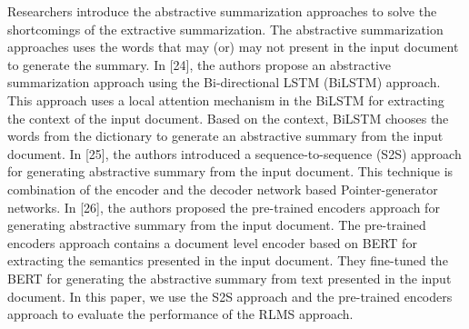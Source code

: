 \documentclass[preprint,review,12pt]{elsarticle}
\begin{document}
Researchers introduce the abstractive summarization approaches \cite{24,25,26} to solve the shortcomings of the extractive summarization. The abstractive summarization approaches uses the words that may (or) may not present in the input document to generate the summary. In [24], the authors propose an abstractive summarization approach using the Bi-directional LSTM (BiLSTM) approach. This approach uses a local attention mechanism in the BiLSTM for extracting the context of the input document. Based on the context, BiLSTM chooses the words from the dictionary to generate an abstractive summary from the input document. In [25], the authors introduced a sequence-to-sequence (S2S) approach for generating abstractive summary from the input document. This technique is combination of the encoder and the decoder network based Pointer-generator networks. In [26], the authors proposed the pre-trained encoders approach for generating abstractive summary from the input document. The pre-trained encoders approach contains a document level encoder based on BERT for extracting the semantics presented in the input document. They fine-tuned the BERT for generating the abstractive summary from text presented in the input document. In this paper, we use the S2S approach and the pre-trained encoders approach to evaluate the performance of the RLMS approach. 
		
\end{document}
